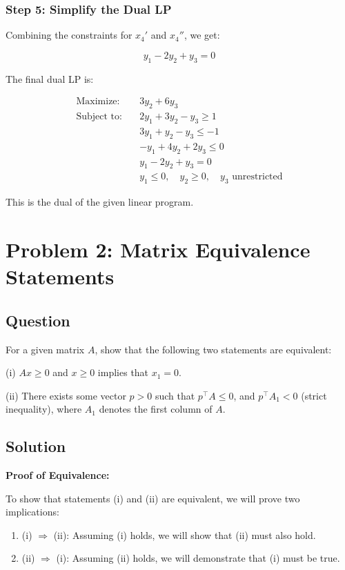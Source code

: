 \documentclass[12pt,letterpaper]{article}
\begin{document}
\subsubsection{Step 5: Simplify the Dual LP}

Combining the constraints for $x_4'$ and $x_4''$, we get:

\begin{equation*}
y_1 - 2y_2 + y_3 = 0
\end{equation*}

The final dual LP is:

\begin{align*}
\text{Maximize:} \quad & 3y_2 + 6y_3 \\
\text{Subject to:} \quad
& 2y_1 + 3y_2 - y_3 \geq 1 \\
& 3y_1 + y_2 - y_3 \leq -1 \\
& -y_1 + 4y_2 + 2y_3 \leq 0 \\
& y_1 - 2y_2 + y_3 = 0 \\
& y_1 \leq 0, \quad y_2 \geq 0, \quad y_3 \text{ unrestricted}
\end{align*}

This is the dual of the given linear program.

\newpage
\section{Problem 2: Matrix Equivalence Statements}

\subsection{Question}
For a given matrix $A$, show that the following two statements are equivalent:

(i) $Ax \geq 0$ and $x \geq 0$ implies that $x_1 = 0$.

(ii) There exists some vector $p > 0$ such that $p^\top A \leq 0$, and $p^\top A_1 < 0$ (strict inequality), where $A_1$ denotes the first column of $A$.

\subsection{Solution}
\textbf{Proof of Equivalence:}

To show that statements (i) and (ii) are equivalent, we will prove two implications:

\begin{enumerate}
    \item (i) $\Rightarrow$ (ii): Assuming (i) holds, we will show that (ii) must also hold.
    \item (ii) $\Rightarrow$ (i): Assuming (ii) holds, we will demonstrate that (i) must be true.
\end{enumerate}
\end{document}
